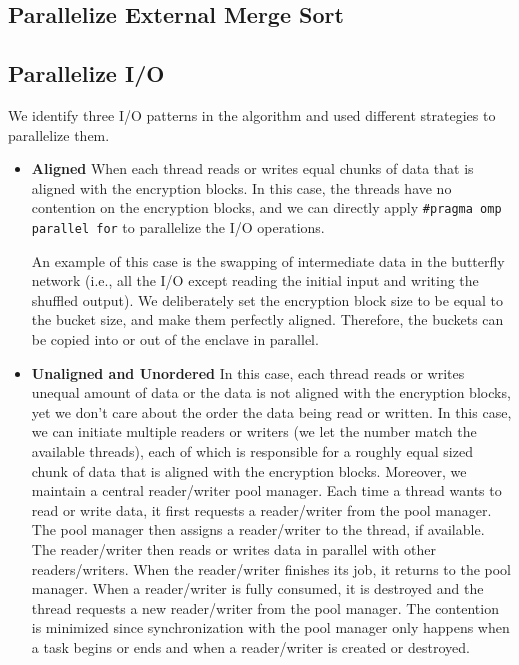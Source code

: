 \documentclass{article}
\begin{document}
\subsection{Parallelize External Merge Sort}
\subsection{Parallelize I/O}
We identify three I/O patterns in the algorithm and used different strategies to parallelize them.
\begin{itemize}
    \item {\bf Aligned}
    When each thread reads or writes equal chunks of data that is aligned with the encryption blocks. In this case, the threads have no contention on the encryption blocks, and we can directly apply {\tt \#pragma omp parallel for} to parallelize the I/O operations.

    An example of this case is the swapping of intermediate data in the butterfly network (i.e., all the I/O except reading the initial input and writing the shuffled output). We deliberately set the encryption block size to be equal to the bucket size, and make them perfectly aligned. Therefore, the buckets can be copied into or out of the enclave in parallel.
    \item {\bf Unaligned and Unordered}
    In this case, each thread reads or writes unequal amount of data or the data is not aligned with the encryption blocks, yet we don't care about the order the data being read or written. In this case, we can initiate multiple readers or writers (we let the number match the available threads), each of which is responsible for a roughly equal sized chunk of data that is aligned with the encryption blocks. Moreover, we maintain a central reader/writer pool manager. Each time a thread wants to read or write data, it first requests a reader/writer from the pool manager. The pool manager then assigns a reader/writer to the thread, if available. The reader/writer then reads or writes data in parallel with other readers/writers. When the reader/writer finishes its job, it returns to the pool manager. When a reader/writer is fully consumed, it is destroyed and the thread requests a new reader/writer from the pool manager. The contention is minimized since synchronization with the pool manager only happens when a task begins or ends and when a reader/writer is created or destroyed.


\end{itemize}
\end{document}
